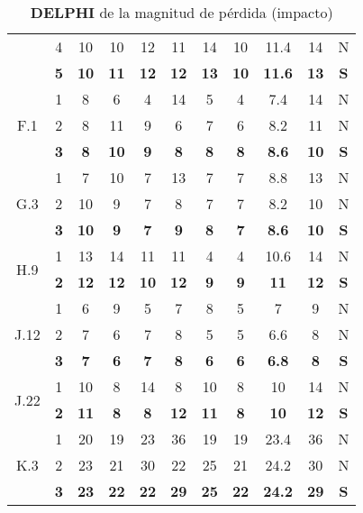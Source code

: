 \documentclass[11pt,a4paper,spanish,twoside]{report}
\begin{document}
\begin{table}[!h]
\begin{tabular}{|c|c||c|c|c|c|c||c|c|c||c|}
    & 4 & 10 & 10 & 12 & 11 & 14 & 10 & 11.4 & 14 & N \\
    & \textbf{5} & \textbf{10} & \textbf{11} & \textbf{12} & \textbf{12} &
    \textbf{13} & \textbf{10} & \textbf{11.6} & \textbf{13} & \textbf{S} \\ 
    \hline
    \multirow{3}{c}{F.1} & 1 & 8 & 6 & 4 & 14 & 5 & 4 & 7.4 & 14 & N \\
    & 2 & 8 & 11 & 9 & 6 & 7 & 6 & 8.2 & 11 & N \\
    & \textbf{3} & \textbf{8} & \textbf{10} & \textbf{9} & \textbf{8} &
    \textbf{8} & \textbf{8} & \textbf{8.6} & \textbf{10} & \textbf{S} \\ 
    \hline
    \multirow{3}{c}{G.3} & 1 & 7 & 10 & 7 & 13 & 7 & 7 & 8.8 & 13 & N \\
    & 2 & 10 & 9 & 7 & 8 & 7 & 7 & 8.2 & 10 & N \\
    & \textbf{3} & \textbf{10} & \textbf{9} & \textbf{7} & \textbf{9} &
    \textbf{8} & \textbf{7} & \textbf{8.6} & \textbf{10} & \textbf{S} \\ 
    \hline
    \multirow{2}{c}{H.9} & 1 & 13 & 14 & 11 & 11 & 4 & 4 & 10.6 & 14 & N \\
    & \textbf{2} & \textbf{12} & \textbf{12} & \textbf{10} & \textbf{12} &
    \textbf{9} & \textbf{9} & \textbf{11} & \textbf{12} & \textbf{S} \\ 
    \hline
    \multirow{3}{c}{J.12} & 1 & 6 & 9 & 5 & 7 & 8 & 5 & 7 & 9 & N \\
    & 2 & 7 & 6 & 7 & 8 & 5 & 5 & 6.6 & 8 & N \\
    & \textbf{3} & \textbf{7} & \textbf{6} & \textbf{7} & \textbf{8} &
    \textbf{6} & \textbf{6} & \textbf{6.8} & \textbf{8} & \textbf{S} \\ 
    \hline
    \multirow{2}{c}{J.22} & 1 & 10 & 8 & 14 & 8 & 10 & 8 & 10 & 14 & N \\
    & \textbf{2} & \textbf{11} & \textbf{8} & \textbf{8} & \textbf{12} &
    \textbf{11} & \textbf{8} & \textbf{10} & \textbf{12} & \textbf{S} \\ 
    \hline
    \multirow{3}{c}{K.3} & 1 & 20 & 19 & 23 & 36 & 19 & 19 & 23.4 & 36 & N \\
    & 2 & 23 & 21 & 30 & 22 & 25 & 21 & 24.2 & 30 & N \\
    & \textbf{3} & \textbf{23} & \textbf{22} & \textbf{22} & \textbf{29} &
    \textbf{25} & \textbf{22} & \textbf{24.2} & \textbf{29} & \textbf{S} \\ 

   \end{tabular}
  \caption{\textbf{DELPHI} de la magnitud de pérdida (impacto)}
  \label{Tab:DELPHImag}
\end{table}
\end{document}
